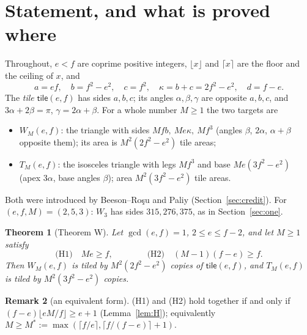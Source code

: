 \documentclass[11pt,reqno]{amsart}
\theoremstyle{plain}
\newtheorem{theorem}{Theorem}[section]
\theoremstyle{definition}
\newtheorem{remark}[theorem]{Remark}
\newcommand{\tile}{\mathsf{tile}}
\begin{document}
\section{Statement, and what is proved where}\label{sec:stmt}
Throughout, $e<f$ are coprime positive integers, $\lfloor x\rfloor$ and $\lceil x\rceil$ are the floor and the ceiling of $x$, and
\[
a=ef,\quad b=f^2-e^2,\quad c=f^2,\quad \kappa=b+c=2f^2-e^2,\quad d=f-e.
\]
The \emph{tile} $\tile(e,f)$ has sides $a,b,c$; its angles $\alpha,\beta,\gamma$ are opposite $a,b,c$, and $3\alpha+2\beta=\pi$, $\gamma=2\alpha+\beta$. For a whole number $M\ge1$ the two targets are
\begin{itemize}\itemsep0pt
\item $W_M(e,f)$: the triangle with sides $Mfb,\ Me\kappa,\ Mf^3$ (angles $\beta$, $2\alpha$, $\alpha{+}\beta$ opposite them); its area is $M^2(2f^2-e^2)$ tile areas;
\item $T_M(e,f)$: the isosceles triangle with legs $Mf^3$ and base $Me(3f^2-e^2)$ (apex $3\alpha$, base angles $\beta$); area $M^2(3f^2-e^2)$ tile areas.
\end{itemize}
Both were introduced by Beeson--Ro\c{s}u and Paliy (Section~\ref{sec:credit}). For $(e,f,M)=(2,5,3)$: $W_3$ has sides $315,276,375$, as in Section~\ref{sec:one}.

\begin{theorem}[Theorem W]\label{thm:W}
Let $\gcd(e,f)=1$, $2\le e\le f-2$, and let $M\ge1$ satisfy
\[
\text{(H1)}\quad Me\ge f,\qquad\qquad \text{(H2)}\quad (M-1)(f-e)\ge f .
\]
Then $W_M(e,f)$ is tiled by $M^2(2f^2-e^2)$ copies of $\tile(e,f)$, and $T_M(e,f)$ is tiled by $M^2(3f^2-e^2)$ copies.
\end{theorem}
\begin{remark}[an equivalent form]\label{rem:equiv}
(H1) and (H2) hold together if and only if $(f-e)\lfloor eM/f\rfloor\ge e+1$ (Lemma~\ref{lem:H}); equivalently $M\ge M^*:=\max(\lceil f/e\rceil,\lceil f/(f-e)\rceil+1)$.
\end{remark}
\end{document}
